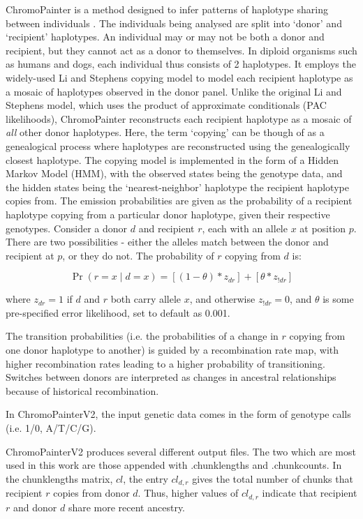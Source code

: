 ChromoPainter is a method designed to infer patterns of haplotype sharing between individuals \cite{Lawson2012}. The individuals being analysed are split into `donor' and `recipient' haplotypes. An individual may or may not be both a donor and recipient, but they cannot act as a donor to themselves. In diploid organisms such as humans and dogs, each individual thus consists of 2 haplotypes. It employs the widely-used Li and Stephens copying model \cite{Li2003} to model each recipient haplotype as a mosaic of haplotypes observed in the donor panel. Unlike the original Li and Stephens model, which uses the product of approximate conditionals (PAC likelihoods), ChromoPainter reconstructs each recipient haplotype as a mosaic of \textit{all} other donor haplotypes. Here, the term `copying' can be though of as a genealogical process where haplotypes are reconstructed using the genealogically closest haplotype. The copying model is implemented in the form of a Hidden Markov Model (HMM), with the observed states being the genotype data, and the hidden states being the `nearest-neighbor' haplotype the recipient haplotype copies from. The emission probabilities are given as the probability of a recipient haplotype copying from a particular donor haplotype, given their respective genotypes. Consider a donor $d$ and recipient $r$, each with an allele $x$ at position $p$. There are two possibilities - either the alleles match between the donor and recipient at $p$, or they do not. The probability of $r$ copying from $d$ is: 

\begin{equation}
\Pr(r = x \mid d = x) = [(1-\theta) * z_{dr}] + [\theta * z_{!dr}] 
\end{equation}

where $z_{dr} = 1$ if $d$ and $r$ both carry allele $x$, and otherwise $z_{!dr} = 0$, and $\theta$ is some pre-specified error likelihood, set to default as 0.001. 

The transition probabilities (i.e. the probabilities of a change in $r$ copying from one donor haplotype to another) is guided by a recombination rate map, with higher recombination rates leading to a higher probability of transitioning. Switches between donors are interpreted as changes in ancestral relationships because of historical recombination.

In ChromoPainterV2, the input genetic data comes in the form of genotype calls (i.e. 1/0, A/T/C/G).

ChromoPainterV2 produces several different output files. The two which are most used in this work are those appended with .chunklengths and .chunkcounts. In the chunklengths matrix, $cl$, the entry $cl_{d,r}$ gives the total number of chunks that recipient $r$ copies from donor $d$. Thus, higher values of $cl_{d,r}$ indicate that recipient $r$ and donor $d$ share more recent ancestry. 

